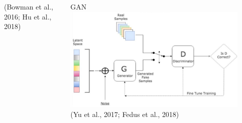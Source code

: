 \documentclass[10pt]{beamer}
\begin{document}
\begin{frame}
\begin{columns}[T]
\begin{column}[T]{0.33\textwidth}
\begin{center}
            (Bowman et al., 2016; Hu et al., 2018)
        \end{center}
    \end{column}
    \vline
    \begin{column}[T]{0.33\textwidth}
        \begin{center}
            GAN \\
            \includegraphics[width=0.9\textwidth]{images/gan.png} \\
            (Yu et al., 2017; Fedus et al., 2018)
        \end{center}
    \end{column}
\end{columns}

\end{frame}
\end{document}
